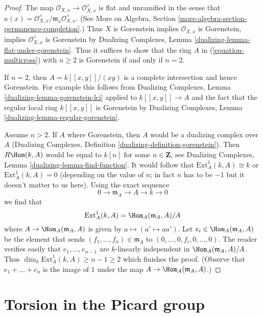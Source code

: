 \begin{proof}
The map $\mathcal{O}_{X, x} \to \mathcal{O}_{X, x}^\wedge$
is flat and unramified in the sense that
$\kappa(x) = \mathcal{O}_{X, x}^\wedge/\mathfrak m_x \mathcal{O}_{X, x}^\wedge$.
(See More on Algebra, Section \ref{more-algebra-section-permanence-completion}.)
Thus $X$ is Gorenstein implies $\mathcal{O}_{X, x}$ is Gorenstein, implies
$\mathcal{O}_{X, x}^\wedge$ is Gorenstein by
Dualizing Complexes, Lemma \ref{dualizing-lemma-flat-under-gorenstein}.
Thus it suffices to show that the ring $A$ in
(\ref{equation-multicross}) with $n \geq 2$
is Gorenstein if and only if $n = 2$.

\medskip\noindent
If $n = 2$, then $A = k[[x, y]]/(xy)$ is a complete intersection
and hence Gorenstein. For example this follows from
Dualizing Complexes, Lemma \ref{dualizing-lemma-gorenstein-lci}
applied to $k[[x, y]] \to A$ and the fact that the regular
local ring $k[[x, y]]$ is Gorenstein by
Dualizing Complexes, Lemma \ref{dualizing-lemma-regular-gorenstein}.

\medskip\noindent
Assume $n > 2$. If $A$ where Gorenstein, then $A$ would be a
dualizing complex over $A$
(Dualizing Complexes, Definition \ref{dualizing-definition-gorenstein}).
Then $R\Hom(k, A)$ would be equal to $k[n]$ for some $n \in \mathbf{Z}$, see
Dualizing Complexes, Lemma \ref{dualizing-lemma-find-function}.
It would follow that $\text{Ext}^1_A(k, A) \cong k$
or $\text{Ext}^1_A(k, A) = 0$ (depending on the value of $n$;
in fact $n$ has to be $-1$ but it doesn't matter to us here).
Using the exact sequence
$$
0 \to \mathfrak m_A \to A \to k \to 0
$$
we find that
$$
\text{Ext}^1_A(k, A) = \Hom_A(\mathfrak m_A, A)/A
$$
where $A \to \Hom_A(\mathfrak m_A, A)$ is given by
$a \mapsto (a' \mapsto aa')$. Let $e_i \in \Hom_A(\mathfrak m_A, A)$
be the element that sends $(f_1, \ldots, f_n) \in \mathfrak m_A$ to
$(0, \ldots, 0, f_i, 0, \ldots, 0)$. The reader verifies easily
that $e_1, \ldots, e_{n - 1}$ are $k$-linearly independent in
$\Hom_A(\mathfrak m_A, A)/A$. Thus
$\dim_k \text{Ext}^1_A(k, A) \geq n - 1 \geq 2$ which
finishes the proof.
(Observe that $e_1 + \ldots + e_n$ is the image of $1$ under the map
$A \to \Hom_A(\mathfrak m_A, A)$.)
\end{proof}




\section{Torsion in the Picard group}
\label{section-torsion-in-pic}

